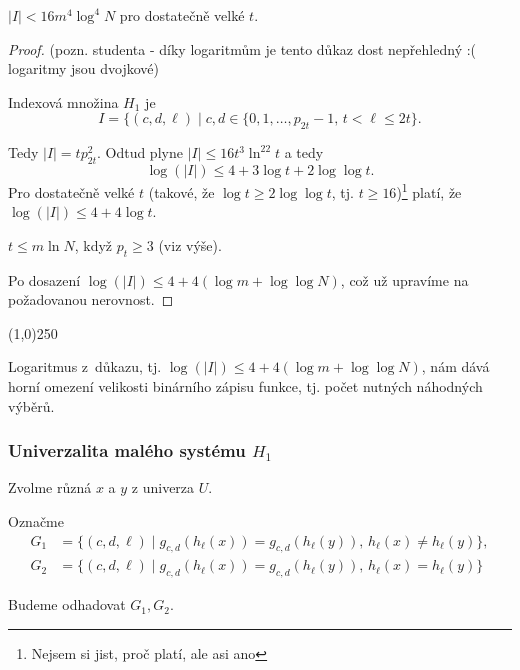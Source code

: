 \documentclass[a4paper,12pt]{article}
\newenvironment{myproof}{
  \begin{proof}
    
  }{
  \end{proof}
  \begin{center}
   \line(1,0){250}
   \end{center}
  }
\begin{document}
\begin{veta}
    $|I|<16 m^4 \log^4N$ pro dostatečně velké $t$.
\end{veta}
\begin{myproof}
    (pozn. studenta - díky logaritmům je tento důkaz dost nepřehledný :( logaritmy jsou dvojkové)
    
Indexová množina $
H_1$ je 
$$I=\{(c,d,\ell )\mid c,d\in \{0,1,\dots,p_{2t}-1,\,t<\ell\le 2t\}
.$$
  
Tedy $|I|=tp_{2t}^2$.   
Odtud plyne $|I|\le 16t^3\ln^22t$ a tedy 
$$\log(|I|)\le 4+3\log t+2\log\log t.$$
Pro dostatečně velké $t$ (takové, že $\log t\ge 2\log\log 
t$, tj. $t\ge 16$)\footnote{Nejsem si jist, proč platí, ale asi ano} platí, 
že $\log(|I|)\le 4+4\log t$. 

$t\le m\ln N$, když $p_t\ge 3$ (viz výše).

Po dosazení $\log(|I|)\le 4+4(\log m+\log\log N)$, což už upravíme na požadovanou nerovnost. 
\end{myproof}

\begin{pozorovani}
    Logaritmus z~důkazu, tj. $\log(|I|)\le 4+4(\log m+\log\log N)$, nám dává horní omezení velikosti binárního zápisu funkce, tj. počet nutných náhodných výběrů.
\end{pozorovani}


\subsubsection{Univerzalita malého systému $H_1$}

Zvolme různá $x$ a $y$ z univerza $U$. 

\begin{definice}
Označme
\begin{align*} G_1&=\{(c,d,\ell )\mid g_{c,d}(h_{\ell}(x))=g_{c,d}(h_{\ell}
(y)),\,h_{\ell}(x)\ne h_{\ell}(y)\},\\
G_2&=\{(c,d,\ell )\mid g_{c,d}(h_{\ell}(x))=g_{c,d}(h_{\ell}(y)),\,
h_{\ell}(x)=h_{\ell}(y)\}\end{align*}
\end{definice}
Budeme odhadovat $G_1, G_2$.
\end{document}
